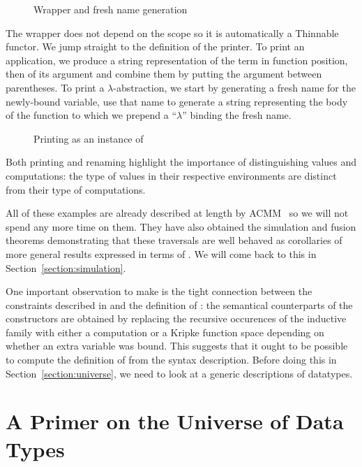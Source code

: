 \begin{figure}[h]
\caption{Wrapper and fresh name generation}
\end{figure}

The wrapper  does not depend on the scope \AB{$\Gamma$} so it is automatically
a Thinnable functor. We jump straight
to the definition of the printer. To print an application, we produce
a string representation of the term in function position, then of its argument and combine
them by putting the argument between parentheses. To print a $\lambda$-abstraction,
we start by generating a fresh name for the newly-bound variable, use that
name to generate a string representing the body of the function to which we
prepend a ``$\lambda$'' binding the fresh name.

\begin{figure}[h]
\caption{Printing as an instance of }
\end{figure}

Both printing and renaming highlight the importance of distinguishing
values and computations: the type of values in their respective
environments are distinct from their type of computations.

All of these examples are already described at length by ACMM~\citeyear{allais2017type}
so we will not spend any
more time on them. They have also obtained the simulation and fusion
theorems demonstrating that these traversals are well behaved as
corollaries of more general results expressed in terms of .
We will come back to this in Section~\ref{section:simulation}.

One important observation to make is the tight connection between the constraints
described in  and the definition of : the semantical counterparts
of the  constructors are obtained by replacing the recursive occurences of
the inductive family with either a computation or a Kripke function space depending
on whether an extra variable was bound. This suggests that it ought to be possible
to compute the definition of  from the syntax description. Before doing this
in Section~\ref{section:universe}, we need to look at a generic descriptions of
datatypes.




\section{A Primer on the Universe of Data Types}\label{section:data}

